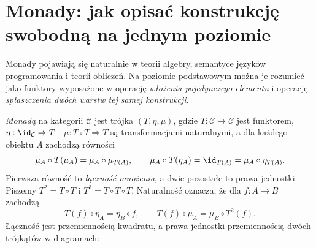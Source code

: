 \section{Monady: jak opisać konstrukcję swobodną na jednym poziomie}\label{sec:monads}

Monady pojawiają się naturalnie w teorii algebry, semantyce języków programowania i teorii obliczeń. Na poziomie podstawowym można je rozumieć jako funktory wyposażone w operację \emph{włożenia pojedynczego elementu} i operację \emph{spłaszczenia dwóch warstw tej samej konstrukcji}.

\begin{definicja}[Monada]\label{def:monad}
\emph{Monadą} na kategorii $\mathcal C$ jest trójka $(T,\eta,\mu)$, gdzie $T:\mathcal C\to\mathcal C$ jest funktorem, $\eta:\id_{\mathcal C}\Rightarrow T$ i $\mu:T\circ T\Rightarrow T$ są transformacjami naturalnymi, a dla każdego obiektu $A$ zachodzą równości
\[
\mu_A\circ T(\mu_A)=\mu_A\circ\mu_{T(A)},\qquad\mu_A\circ T(\eta_A)=\id_{T(A)}=\mu_A\circ\eta_{T(A)}.
\]
Pierwsza równość to \emph{łączność mnożenia}, a dwie pozostałe to prawa jednostki. Piszemy $T^2=T\circ T$ i $T^3=T\circ T\circ T$. Naturalność oznacza, że dla $f:A\to B$ zachodzą
\[
T(f)\circ\eta_A=\eta_B\circ f,\qquad
T(f)\circ\mu_A=\mu_B\circ T^2(f).
\]
Łączność jest przemiennością kwadratu, a prawa jednostki przemiennością dwóch trójkątów w diagramach:
\begin{center}
\end{center}
\begin{center}
\end{center}
\end{definicja}

